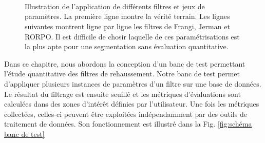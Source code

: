 \begin{figure}[!ht]
  \centering
\\
  \\
  \\
  \caption{Illustration de l'application de différents filtres et jeux de paramètres. La première ligne montre la vérité terrain. Les lignes suivantes montrent ligne par ligne les filtres de Frangi, Jerman et RORPO. Il est difficile de chosir laquelle de ces paramétrisations est la plus apte pour une segmentation sans évaluation quantitative.}
  \label{fig:problematics}
\end{figure}

Dans ce chapitre, nous abordons la conception d'un banc de test permettant l'étude quantitative des filtres de rehaussement. Notre banc de test permet d'appliquer plusieurs instances de paramètres d'un filtre sur une base de données. Le résultat du filtrage est ensuite seuillé et les métriques d'évaluations sont calculées dans des zones d'intérêt définies par l'utilisateur. Une fois les métriques collectées, celles-ci peuvent être exploitées indépendamment par des outils de traitement de données. Son fonctionnement est illustré dans la Fig. \ref{fig:schéma banc de test}

